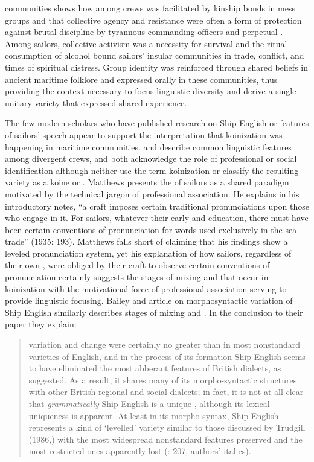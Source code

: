 communities shows how  among crews was facilitated by kinship bonds in mess groups and that collective agency and resistance were often a form of protection against brutal discipline by tyrannous commanding officers and perpetual . Among sailors, collective activism was a necessity for survival and the ritual consumption of alcohol bound sailors’ insular communities in trade, conflict, and times of spiritual distress. Group identity was reinforced through shared beliefs in ancient maritime folklore and expressed orally in these communities, thus providing the context necessary to focus linguistic diversity and derive a single unitary variety that expressed shared experience. 


The few modern scholars who have published research on Ship English or features of sailors’ speech appear to support the interpretation that koinization was happening in maritime communities. \citet{Matthews1935} and \citet{BaileyRoss1988} describe common linguistic features among divergent crews, and both acknowledge the role of professional or social identification although neither use the term koinization or classify the resulting variety as a koine or . Matthews presents the  of sailors as a shared paradigm motivated by the technical jargon of professional association. He explains in his introductory notes, “a craft imposes certain traditional pronunciations upon those who engage in it. For sailors, whatever their early  and education, there must have been certain conventions of pronunciation for words used exclusively in the sea-trade” (1935: 193). Matthews falls short of claiming that his findings show a leveled pronunciation system, yet his explanation of how sailors, regardless of their own , were obliged by their craft to observe certain conventions of pronunciation certainly suggests the stages of mixing and  that occur in koinization with the motivational force of professional association serving to provide linguistic focusing. Bailey and  article on morphosyntactic variation of Ship English similarly describes stages of mixing and . In the conclusion to their paper they explain: 


\begin{quotation}
variation and change were certainly no greater than in most nonstandard varieties of English, and in the process of its formation Ship English seems to have eliminated the most abberant features of British dialects, as \citet{Hancock1976} suggested. As a result, it shares many of its morpho-syntactic structures with other British regional and social dialects; in fact, it is not at all clear that \textit{grammatically} Ship English is a unique , although its lexical uniqueness is apparent. At least in its morpho-syntax, Ship English represents a kind of ‘levelled’ variety similar to those discussed by Trudgill (1986,) with the most widespread nonstandard features preserved and the most restricted ones apparently lost (\citealt{BaileyRoss1988}: 207, authors’ italics). 
\end{quotation}

